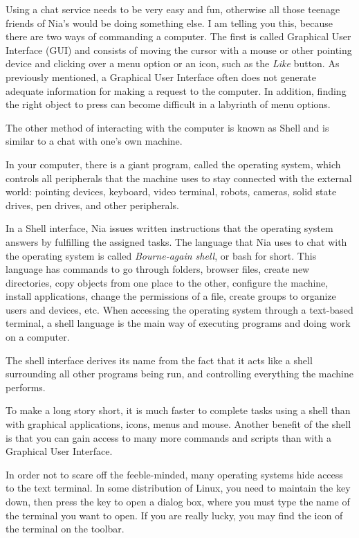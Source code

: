 \documentclass[a4paper,12pt]{book}
\begin{document}
Using a chat service needs to
be very easy and fun, otherwise all those teenage
friends of Nia's would be doing something else.
I am telling you this, because there are
two ways of commanding a computer.
The first is called Graphical User Interface (GUI)
and consists of moving the cursor with a
mouse or other pointing device and clicking
over a menu option or an icon,
such as the {\em Like} button.
As previously mentioned, a Graphical User Interface
often does not generate adequate information
for making a request to the computer. In addition,
finding the right object  to press
can become difficult in a labyrinth of
menu options.

The other method of interacting with
the computer is known as Shell and is similar to
a chat with one's own machine.

In your computer, there is a giant
program, called the operating system, which controls
all peripherals that the machine uses to
stay connected with the external world:
pointing devices,  keyboard,
video terminal, robots, cameras, solid
state drives, pen drives, and other peripherals.

In a Shell interface, Nia issues written instructions
that the operating system answers by fulfilling the
assigned tasks. The language that Nia
uses to chat with the operating
system is called {\em Bourne-again shell}, or
bash for short. This language has
commands to go through folders, browser
files, create new directories, copy
objects from one place to the other,
configure the machine, install
applications, change the permissions
of a file, create groups to organize
users and devices, etc.
When accessing the operating system through
a text-based terminal, a shell language is the main way
of executing programs and doing work on a computer.

The shell interface derives its name from
the fact that it acts like a shell
surrounding all other programs being run,
and controlling everything the machine performs.

To make a long story short,
it is much faster to complete tasks
using a shell than with graphical applications,
icons, menus and mouse. Another benefit of the
shell is that you can gain access to many
more commands and scripts than with
a Graphical User Interface.

In order not to scare off the feeble-minded,
many operating systems hide access
to the text terminal. In some distribution
of Linux, you need to maintain the  key
down, then press the  key to open a
dialog box, where you must type the
name of the terminal you want to open.
If you are really lucky, you may find
the icon of the terminal  on the
toolbar.
\end{document}

